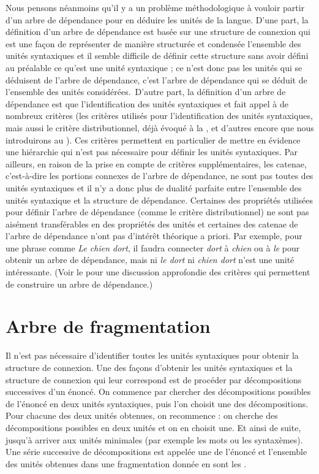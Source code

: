 {    Nous pensons néanmoins qu’il y a un problème méthodologique à vouloir partir d’un arbre de dépendance pour en déduire les unités de la langue. D’une part, la définition d’un arbre de dépendance est basée sur une structure de connexion qui est une façon de représenter de manière structurée et condensée l’ensemble des unités syntaxiques et il semble difficile de définir cette structure sans avoir défini au préalable ce qu’est une unité syntaxique ; ce n’est donc pas les unités qui se déduisent de l’arbre de dépendance, c’est l’arbre de dépendance qui se déduit de l’ensemble des unités considérées.~D’autre part, la définition d’un arbre de dépendance est  que l’identification des unités syntaxiques et fait appel à de nombreux critères (les critères utilisés pour l’identification des unités syntaxiques, mais aussi le critère distributionnel, déjà évoqué à la , et d’autres encore que nous introduirons au ). Ces critères permettent en particulier de mettre en évidence une hiérarchie qui n’est pas nécessaire pour définir les unités syntaxiques. Par ailleurs, en raison de la prise en compte de critères supplémentaires, les catenae, c’est-à-dire les portions connexes de l’arbre de dépendance, ne sont pas toutes des unités syntaxiques et il n’y a donc plus de dualité parfaite entre l’ensemble des unités syntaxique et la structure de dépendance. Certaines des propriétés utilisées pour définir l’arbre de dépendance (comme le critère distributionnel) ne sont pas aisément transférables en des propriétés des unités et certaines des catenae de l’arbre de dépendance n’ont pas d’intérêt théorique a priori. Par exemple, pour une phrase comme \textit{Le chien dort}, il faudra connecter \textit{dort} à \textit{chien} ou à \textit{le} pour obtenir un arbre de dépendance, mais ni \textit{le dort} ni \textit{chien dort} n’est une unité intéressante. (Voir le  pour une discussion approfondie des critères qui permettent de construire un arbre de dépendance.)
}
\section{Arbre de fragmentation}\label{sec:3.2.21}

Il n’est pas nécessaire d’identifier toutes les unités syntaxiques pour obtenir la structure de connexion. Une des façons d’obtenir les unités syntaxiques et la structure de connexion qui leur correspond est de procéder par décompositions successives d’un énoncé. On commence par chercher des décompositions possibles de l’énoncé en deux unités syntaxiques, puis l’on choisit une des décompositions. Pour chacune des deux unités obtenues, on recommence : on cherche des décompositions possibles en deux unités et on en choisit une. Et ainsi de suite, jusqu’à arriver aux unités minimales (par exemple les mots ou les syntaxèmes). Une série successive de décompositions est appelée une  de l’énoncé et l’ensemble des unités obtenues dans une fragmentation donnée en sont les .

